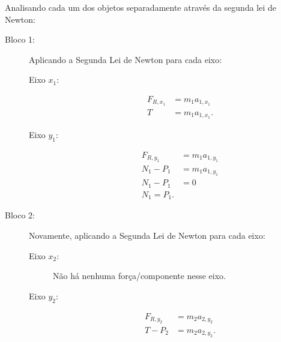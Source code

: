 Analisando cada um dos objetos separadamente através da segunda lei de Newton:
\begin{description}
    \item[Bloco 1:] Aplicando a Segunda Lei de Newton para cada eixo:
        \begin{description}
            \item[Eixo $x_1$:]
                \begin{align}
                    F_{R, x_1} &= m_1 a_{1,x_1} \\
                    T & = m_1 a_{1,x_1}. \label{Eq:AtwoodHorizX1}
                \end{align}
            \item[Eixo $y_1$:]
                \begin{align}
                    F_{R, y_1} &= m_1 a_{1,y_1} \\
                    N_1 - P_1 &= m_1 a_{1,y_1} \\
                    N_1 - P_1 &= 0 \\
                    N_1 = P_1.
                \end{align}
        \end{description}
    \item[Bloco 2:] Novamente, aplicando a Segunda Lei de Newton para cada eixo:
        \begin{description}
            \item[Eixo $x_2$:] Não há nenhuma força/componente nesse eixo.
            \item[Eixo $y_2$:]
                \begin{align}
                    F_{R, y_2} &= m_2 a_{2,y_2} \\
                    T - P_2 &= m_2 a_{2,y_2}. \label{Eq:AtwoodHorizY2}
                \end{align}
        \end{description}
\end{description}

